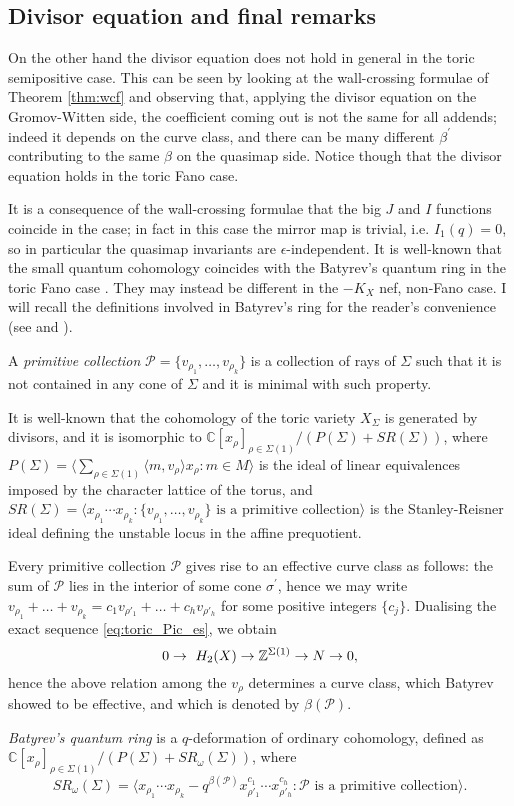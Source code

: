\subsection{Divisor equation and final remarks} On the other hand the divisor equation does not hold in general in the toric semipositive case. This can be seen by looking at the wall-crossing formulae of Theorem \ref{thm:wcf} and observing that, applying the divisor equation on the Gromov-Witten side, the coefficient coming out is not the same for all addends; indeed it depends on the curve class, and there can be many different $\beta^\prime$ contributing to the same $\beta$ on the quasimap side. Notice though that the divisor equation holds in the toric Fano case.

It is a consequence of the wall-crossing formulae that the big $J$ and $I$ functions coincide in the  case; in fact in this case the mirror map is trivial, i.e. $I_1(q)=0$, so in particular the quasimap invariants are $\epsilon$-independent. It is well-known that the small quantum cohomology coincides with the Batyrev's quantum ring in the toric Fano case \cite[Example 11.2.5.2]{MS}. They may instead be different in the $-K_X$ nef, non-Fano case. I will recall the definitions involved in Batyrev's ring for the reader's convenience (see \cite{Batyrev} and \cite[Example 8.1.2.2]{MS}).
\begin{definition}
 A \emph{primitive collection} $\mathcal P=\{v_{\rho_1},\ldots,v_{\rho_k}\}$ is a collection of rays of $\Sigma$ such that it is not contained in any cone of $\Sigma$ and it is minimal with such property.
 
 It is well-known that the cohomology of the toric variety $X_\Sigma$ is generated by divisors, and it is isomorphic to $\mathbb C[x_\rho]_{\rho\in\Sigma(1)}/(P(\Sigma)+SR(\Sigma))$, where $P(\Sigma)=\langle \sum_{\rho\in\Sigma(1)}\langle m,v_\rho\rangle x_\rho : m\in M\rangle$ is the ideal of linear equivalences imposed by the character lattice of the torus, and $SR(\Sigma)=\langle x_{\rho_1}\cdots x_{\rho_k} : \{v_{\rho_1},\ldots,v_{\rho_k}\} \text{ is a primitive collection}\rangle$ is the Stanley-Reisner ideal defining the unstable locus in the affine prequotient.
 
 Every primitive collection $\mathcal P$ gives rise to an effective curve class as follows: the sum of $\mathcal P$ lies in the interior of some cone $\sigma^\prime$, hence we may write $v_{\rho_1}+\ldots+v_{\rho_k}=c_{1}v_{\rho'_1}+\ldots+c_{h}v_{\rho'_h}$ for some positive integers $\{c_j\}$. Dualising the exact sequence \eqref{eq:toric_Pic_es}, we obtain \[0\rightarrow\ H_2(X)\rightarrow \mathbb{Z}^{\Sigma(1)}\rightarrow N\rightarrow 0,\] hence the above relation among the $v_\rho$ determines a curve class, which Batyrev showed to be effective, and which is denoted by $\beta(\mathcal P)$.
 
 \emph{Batyrev's quantum ring} is a $q$-deformation of ordinary cohomology, defined as $\mathbb C[x_\rho]_{\rho\in\Sigma(1)}/(P(\Sigma)+SR_\omega(\Sigma))$, where \[SR_\omega(\Sigma)=\langle x_{\rho_1}\cdots x_{\rho_k}-q^{\beta(\mathcal P)}x_{\rho'_1}^{c_1}\cdots x_{\rho'_h}^{c_h} : \mathcal P\text{ is a primitive collection}\rangle.\]
\end{definition}

